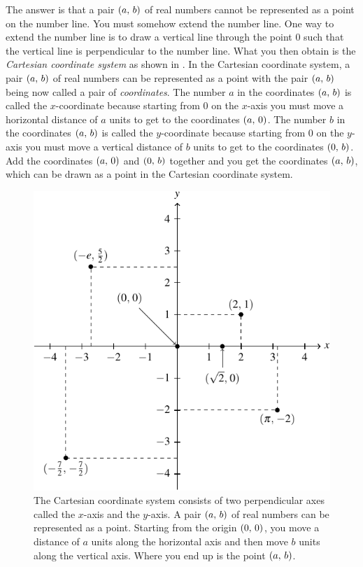 \documentclass[a4paper,oneside,12pt]{article}
\begin{document}
The answer is that a pair $\left\lparen{a},\, {b}\right\rparen$ of real numbers cannot be
represented as a point on the number line.  You must somehow extend
the number line.  One way to extend the number line is to draw a
vertical line through the point $0$ such that the vertical line is
perpendicular to the number line.  What you then obtain is the
\emph{Cartesian coordinate system} as shown in
.  In the Cartesian coordinate
system, a pair $\left\lparen{a},\, {b}\right\rparen$ of real numbers can be represented as a
point with the pair $\left\lparen{a},\, {b}\right\rparen$ being now called a pair of
\emph{coordinates}.  The number $a$ in the coordinates $\left\lparen{a},\, {b}\right\rparen$
is called the $x$-coordinate because starting from $0$ on the
$x$-axis you must move a horizontal distance of $a$ units to get to
the coordinates $\left\lparen{a},\, {0}\right\rparen$.  The number $b$ in the coordinates
$\left\lparen{a},\, {b}\right\rparen$ is called the $y$-coordinate because starting from $0$
on the $y$-axis you must move a vertical distance of $b$ units to get
to the coordinates $\left\lparen{0},\, {b}\right\rparen$.  Add the coordinates $\left\lparen{a},\, {0}\right\rparen$
and $\left\lparen{0},\, {b}\right\rparen$ together and you get the coordinates
$\left\lparen{a},\, {b}\right\rparen$, which can be drawn as a point in the Cartesian
coordinate system.

\begin{figure}[!htbp]
\centering
\includegraphics[scale=1.1]{image/03/cartesian-coordinate.pdf}
\caption{%
  The Cartesian coordinate system consists of two perpendicular axes
  called the $x$-axis and the $y$-axis.  A pair $\left\lparen{a},\, {b}\right\rparen$ of real
  numbers can be represented as a point.  Starting from the origin
  $\left\lparen{0},\, {0}\right\rparen$, you move a distance of $a$ units along the
  horizontal axis and then move $b$ units along the vertical axis.
  Where you end up is the point $\left\lparen{a},\, {b}\right\rparen$.
}
\label{fig:Cartesian_coordinate_system}
\end{figure}
\end{document}
